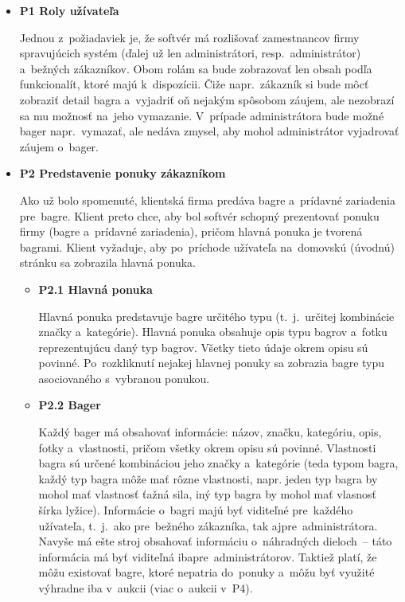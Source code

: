 \begin{itemize}
\item \textbf{P1 Roly užívateľa}
\label{roly uzivatela}

Jednou z~požiadaviek je, že softvér má rozlišovať zamestnancov firmy spravujúcich systém (ďalej už len administrátori, resp.~administrátor) a~bežných zákazníkov. Obom rolám sa bude zobrazovať len obsah podľa funkcionalít, ktoré majú k~dispozícii. Čiže napr.~zákazník si bude môcť zobraziť detail bagra a~vyjadriť oň nejakým spôsobom záujem, ale nezobrazí sa mu možnosť na~jeho vymazanie. V~prípade administrátora bude možné bager napr.~vymazať, ale nedáva zmysel, aby mohol administrátor vyjadrovať záujem o~bager.

\item \textbf{P2 Predstavenie ponuky zákazníkom}

Ako už bolo spomenuté, klientská firma predáva bagre a~prídavné zariadenia pre~bagre. Klient preto chce, aby bol softvér schopný prezentovať ponuku firmy (bagre a~prídavné zariadenia), pričom hlavná ponuka je tvorená bagrami. Klient vyžaduje, aby po~príchode užívateľa na~domovskú (úvodnú) stránku sa zobrazila hlavná ponuka.
\newpage
\begin{itemize}
\item \textbf{P2.1 Hlavná ponuka}

Hlavná ponuka predstavuje bagre určitého typu (t.~j.~určitej kombinácie značky a~kategórie). Hlavná ponuka obsahuje opis typu bagrov a~fotku reprezentujúcu daný typ bagrov. Všetky tieto údaje okrem opisu sú povinné. Po~rozkliknutí nejakej hlavnej ponuky sa zobrazia bagre typu asociovaného s~vybranou ponukou.

\item \textbf{P2.2 Bager}

Každý bager má obsahovať informácie: názov, značku, kategóriu, opis, fotky a~vlastnosti, pričom všetky okrem opisu sú povinné. Vlastnosti bagra sú určené kombináciou jeho značky a~kategórie (teda typom bagra, každý typ bagra môže mať rôzne vlastnosti, napr. jeden typ bagra by mohol mať vlastnosť ťažná sila, iný typ bagra by mohol mať vlasnosť šírka lyžice). Informácie o~bagri majú byť viditeľné pre~každého užívateľa, t.~j.~ako pre~bežného zákazníka, tak aj\linebreak pre~administrátora. Navyše má ešte stroj obsahovať informáciu o~náhradných dieloch~-- táto informácia má byť viditeľná iba\linebreak pre~administrátorov. Taktiež platí, že môžu existovať bagre, ktoré nepatria do~ponuky a~môžu byť využité výhradne iba v~aukcii (viac o~aukcii v~P4).


\end{itemize}
\end{itemize}
